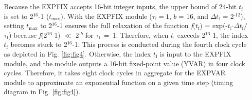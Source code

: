 \documentclass[10pt,journal]{IEEEtran}
\begin{document}
Because the EXP\textunderscore FIX accepts 16-bit integer inputs, the upper bound of 24-bit $t_\textrm{f}$ is set to 2$^\textrm{16}$-1 ($t_\textrm{max}$).
With the EXP\textunderscore FIX module ($\tau_\textrm{f} = 1$, $b$ = 16, and $\Delta t_\textrm{f}$ = 2$^\textrm{-12}$), setting $t_\textrm{max}$ to 2$^\textrm{16}$-1 ensures the full relaxation of the function \textit{f}($t_\textrm{f}$) = exp(-$t_\textrm{f}$$\cdot$$\Delta t_\textrm{f}$$\mathbin{/}$$\tau_\textrm{f}$) because \textit{f}(2$^\textrm{16}$-1) $\ll$ 2$^{\textrm{-}b}$ for $\tau_\textrm{f}$~=~1. 
Therefore, when $t_\textrm{f}$ exceeds 2$^\textrm{16}$-1, the index $t_\textrm{f}$ becomes stuck to 2$^\textrm{16}$-1.
This process is conducted during the fourth clock cycle as depicted in Fig. \ref{fig:fig4}.
Otherwise, the index $t_\textrm{f}$ is input to the EXP\textunderscore FIX module, and the module outputs a 16-bit fixed-point value (Y\textunderscore VAR) in four clock cycles.
Therefore, it takes eight clock cycles in aggregate for the EXP\textunderscore VAR module to approximate an exponential function on a given time step (timing diagram in Fig. \ref{fig:fig4}).
\end{document}
